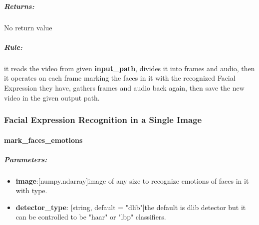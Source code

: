\subparagraph{Returns:} 
\begin{changemargin}{1cm}{0cm} 
No return value
\end{changemargin}

\subparagraph{Rule:}
\begin{changemargin}{1cm}{0cm} 
it reads the video from given \textbf{input\_path}, divides it into frames and audio, then it operates on each frame marking the faces in it with the recognized Facial Expression they have, gathers frames and audio back again, then save the new video in the given output path.
\end{changemargin}

\begin{comment}
\subparagraph{Usage:}
\begin{changemargin}{0.5cm}{0cm} 
	\begin{itemize}
		\item import the module:
		\begin{lstlisting}[language=Python]
		from Cerebro.interface Import process_video as pv\end{lstlisting}
		\item call it:
		\begin{lstlisting}[language=Python]
		pv.detect_video_emotion(video_path, output_path, skip,detector_type, verbose)\end{lstlisting}
	\end{itemize}
\end{changemargin}
\end{comment}

\subsubsection{Facial Expression Recognition in a Single Image}
\paragraph{mark\_faces\_emotions}

\subparagraph{Parameters:}
\begin{changemargin}{0.5cm}{0cm}
\begin{itemize}
	\item \textbf{image}:[numpy.ndarray]image of any size to recognize emotions of faces in it with type.
	\item \textbf{detector\_type}: [string, default = "dlib"]the default is dlib detector but it can be controlled to be "haar" or "lbp" classifiers.	
\end{itemize}
\end{changemargin}

